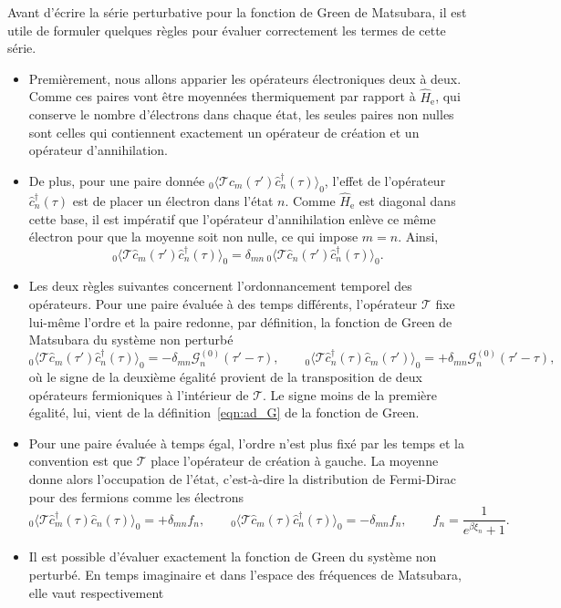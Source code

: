 Avant d'écrire la série perturbative pour la fonction de Green de Matsubara, il est utile de formuler quelques règles pour évaluer correctement les termes de cette série.
\begin{itemize}
    \item Premièrement, nous allons apparier les opérateurs électroniques deux à deux. Comme ces paires vont être moyennées thermiquement par rapport à $\hat{H}_\text{e}$, qui conserve le nombre d'électrons dans chaque état, les seules paires non nulles sont celles qui contiennent exactement un opérateur de création et un opérateur d'annihilation.
    \item De plus, pour une paire donnée ${}_{0}\langle \mathcal{T}\hat{c}_m(\tau')\hat{c}_n^\dag(\tau)\rangle_0$, l'effet de l'opérateur $\hat{c}^\dag_n(\tau)$ est de placer un électron dans l'état $n$. Comme $\hat{H}_\text{e}$ est diagonal dans cette base, il est impératif que l'opérateur d'annihilation enlève ce même électron pour que la moyenne soit non nulle, ce qui impose $m=n$. Ainsi,
    \[{}_{0}\langle \mathcal{T}\hat{c}_m(\tau')\hat{c}_n^\dag(\tau)\rangle_0=\delta_{mn}\, {}_{0}\langle \mathcal{T}\hat{c}_n(\tau')\hat{c}_n^\dag(\tau)\rangle_0.\]
    \item Les deux règles suivantes concernent l'ordonnancement temporel des opérateurs. Pour une paire évaluée à des temps différents, l'opérateur $\mathcal{T}$ fixe lui-même l'ordre et la paire redonne, par définition, la fonction de Green de Matsubara du système non perturbé
    \[{}_0\langle \mathcal{T}\hat{c}_m(\tau')\hat{c}^\dag_n(\tau)\rangle_0=-\delta_{mn} \mathcal{G}_n^{(0)}(\tau'-\tau),\qquad {}_0\langle \mathcal{T}\hat{c}^\dag_n(\tau)\hat{c}_m(\tau')\rangle_0=+\delta_{mn} \mathcal{G}_n^{(0)}(\tau'-\tau),\]
    où le signe de la deuxième égalité provient de la transposition de deux opérateurs fermioniques à l'intérieur de $\mathcal{T}$. Le signe moins de la première égalité, lui, vient de la définition~\eqref{eqn:ad_G} de la fonction de Green.
    \item Pour une paire évaluée à temps égal, l'ordre n'est plus fixé par les temps et la convention est que $\mathcal{T}$ place l'opérateur de création à gauche. La moyenne donne alors l'occupation de l'état, c'est-à-dire la distribution de Fermi-Dirac pour des fermions comme les électrons
    \[{}_0\langle\mathcal{T}\hat{c}^\dag_m(\tau)\hat{c}_n(\tau)\rangle_0=+\delta_{mn}f_n,\qquad {}_0\langle\mathcal{T}\hat{c}_m(\tau)\hat{c}^\dag_n(\tau)\rangle_0=-\delta_{mn}f_n,\qquad f_n=\frac{1}{e^{\beta\xi_n}+1}.\]
    \item Il est possible d'évaluer exactement la fonction de Green du système non perturbé. En temps imaginaire et dans l'espace des fréquences de Matsubara, elle vaut respectivement

\end{itemize}
